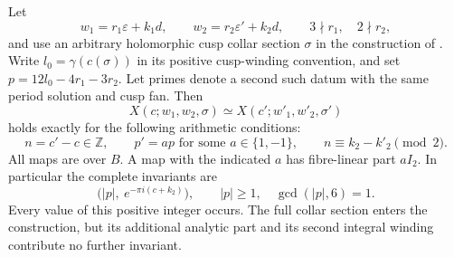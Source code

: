 \begin{proposition}\hypertarget{tag-01QB}{}\label{fam:src:B.2.1}\label{fam:st:B.2.1}

Let
\[
 w_1=r_1\varepsilon+k_1d,\qquad w_2=r_2\varepsilon'+k_2d,
 \qquad 3\nmid r_1,\quad 2\nmid r_2,
\]
and use an arbitrary holomorphic cusp collar section $\sigma$ in the construction of \cite[Section~6.4, pp.~39--40]{AC2026}. Write $l_0=\gamma(c(\sigma))$ in its positive cusp-winding convention, and set $p=12l_0-4r_1-3r_2$. Let primes denote a second such datum with the same period solution and cusp fan. Then
\[
 X(c;w_1,w_2,\sigma)\simeq X(c';w'_1,w'_2,\sigma')
\]
holds exactly for the following arithmetic conditions:
\[
 n=c'-c\in\mathbb Z,\qquad
 p'=a p\text{ for some }a\in\{1,-1\},\qquad
 n\equiv k_2-k'_2\pmod2.
\]
All maps are over $B$. A map with the indicated $a$ has fibre-linear part $aI_2$. In particular the complete invariants are
\[
 \bigl(|p|,\ e^{-\pi i(c+k_2)}\bigr),\qquad
 |p|\ge1,\quad\gcd(|p|,6)=1.
\]
Every value of this positive integer occurs. The full collar section enters the construction, but its additional analytic part and its second integral winding contribute no further invariant.
\end{proposition}


